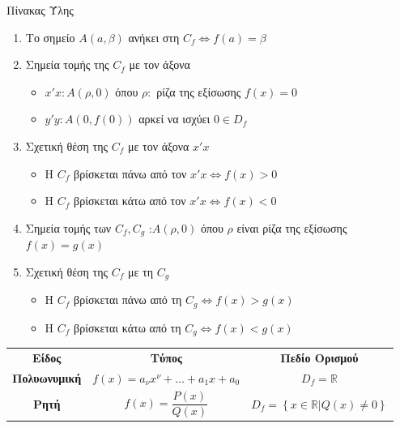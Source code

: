 \documentclass[twoside,nofonts,internet,math,spyros]{frontisthrio}
\begin{document}
\begin{mybox}[mysubtitle]{Πίνακας Ύλης}
\begin{enumerate}[itemsep=0mm,leftmargin=5mm]
\begin{itemize}[leftmargin=3mm]
\item $ f(x)=f(x+T)=f(x-T) $ για κάθε $ x\in D_f $
\end{itemize}
\item Το σημείο $ A(a,\beta) $ ανήκει στη $ C_f \Leftrightarrow f(a)=\beta$
\item Σημεία τομής της $ C_f $ με τον άξονα
\begin{itemize}[leftmargin=4mm]
\item $ x'x : A(\rho,0)$ όπου $ \rho : $ ρίζα της εξίσωσης $ f(x)=0 $
\item $ y'y : A(0,f(0))$ αρκεί να ισχύει $ 0\in D_f $
\end{itemize}
\item Σχετική θέση της $ C_f $ με τον άξονα $ x'x $
\begin{itemize}[leftmargin=4mm]
\item Η $ C_f $ βρίσκεται πάνω από τον $ x'x \Leftrightarrow f(x)>0$
\item Η $ C_f $ βρίσκεται κάτω από τον $ x'x \Leftrightarrow f(x)<0$
\end{itemize}
\item Σημεία τομής των $ C_f,C_g $ :$ A(\rho,0) $ όπου $ \rho $ είναι ρίζα της εξίσωσης $ f(x)=g(x) $
\item Σχετική θέση της $ C_f $ με τη $ C_g $
\begin{itemize}[leftmargin=4mm]
\item Η $ C_f $ βρίσκεται πάνω από τη $ C_g \Leftrightarrow f(x)>g(x)$
\item Η $ C_f $ βρίσκεται κάτω από τη $ C_g \Leftrightarrow f(x)<g(x)$
\end{itemize}
\end{enumerate}
\begin{center}
\begin{tabular}{ccc}
\hline \rule[-2ex]{0pt}{5.5ex}\textbf{Είδος} & \textbf{Τύπος} & \textbf{Πεδίο Ορισμού} \\ 
\hhline{===} \rule[-2ex]{0pt}{5.5ex} \textbf{Πολυωνυμική} & $ f(x)=a_\nu x^\nu+\ldots+a_1x+a_0 $ & $ D_f=\mathbb{R} $ \\
\rule[-2ex]{0pt}{5.5ex} \textbf{Ρητή} & $ f(x)=\dfrac{P(x)}{Q(x)} $ & $ D_f=\left\lbrace\left.  x\in\mathbb{R}\right| Q(x)\neq0\right\rbrace $  \\

\end{tabular}
\end{center}
\end{mybox}
\end{document}
